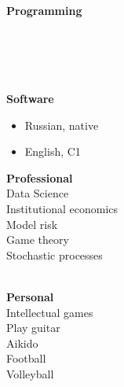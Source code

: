 \documentclass[10pt,a4paper,ragged2e]{altacv}
\begin{document}
\begin{paracol}{2}

\switchcolumn


\textbf {Programming} \\
\\ 
 \\ 
\\


\divider\smallskip \\
\textbf {Software}\\



\begin{itemize}
\item Russian, native
\item English, C1
\end{itemize}

\textbf {Professional} \\
Data Science\\
Institutional economics\\
Model risk\\ 
Game theory\\
Stochastic processes


\divider\smallskip \\
\textbf {Personal}\\
Intellectual games\\
Play guitar\\
Aikido\\
Football\\
Volleyball








\end{paracol}
\end{document}
